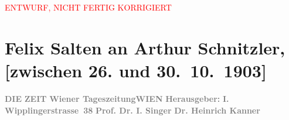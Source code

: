 
\begin{center}
            \textcolor{red}{ENTWURF, NICHT FERTIG KORRIGIERT}
                      \end{center}
            
         
         \renewcommand{\erwaehntePersonen}{Personen: Heinrich Kanner, Ernst Raupach, Isidor Singer}
         \renewcommand{\erwaehnteInstitutionen}{Institutionen: Die Zeit, Raimund-Theater}
         \renewcommand{\erwaehnteOrte}{Orte: Wien, Wipplingerstraße}
         \renewcommand{\erwaehnteWerke}{Werke: Der Müller und sein Kind. Volksdrama in fünf Aufzügen}
               \section[Felix Salten an Arthur Schnitzler, {[}zwischen 26. und 30. 10. 1903{]}]{ Felix Salten an Arthur Schnitzler, {[}zwischen 26. und
               30. 10. 1903{]}}\nopagebreak{}\rehead{ }\begin{ledgroupsized}[t]{13cm}\normalsize\beginnumbering \toendnotes[C]{\smallbreak\pagebreak[2]} 
\toendnotes[C]{\smallbreak}\pstart
           \noindent{}{\pb}\textcolor{gray}{\textbf{DIE}}\pend
           \pstart
           \textcolor{gray}{\textbf{ZEIT}}\pend
           \pstart
           \textcolor{gray}{\textbf{Wiener Tageszeitung}}\hfill \textcolor{gray}{\textbf{WIEN}}\pend
           \pstart
           \textcolor{gray}{\textbf{Herausgeber: }}\hfill \textcolor{gray}{\textbf{I. Wipplingerstrasse 38}}\pend
           \pstart
           \textcolor{gray}{\textbf{Prof. Dr. I. Singer}}\pend
           \pstart
           \textcolor{gray}{\textbf{Dr. Heinrich Kanner}}\pend

\end{ledgroupsized}
